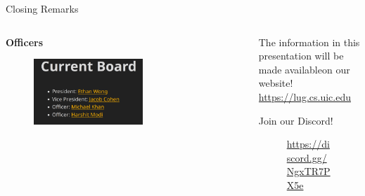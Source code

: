 \documentclass{beamer}
\begin{document}
\begin{frame}{Closing Remarks}
	\begin{columns}
		\begin{column}{0.5\textwidth}
			\textbf{Officers}
			\begin{figure}
				\centering
				\includegraphics[width=0.60\textwidth]{officers.png}
			\end{figure}
		\end{column}
		\begin{column}{0.5\textwidth}
			The information in this presentation will be made
			available\footnotemark on our website!\\
			\url{https://lug.cs.uic.edu}

			\bigskip
			Join our Discord!

			\begin{figure}
				\centering
				
				\caption{\url{https://discord.gg/NgxTR7PX5e}}
			\end{figure}
		\end{column}
	\end{columns}

\end{frame}
\end{document}
